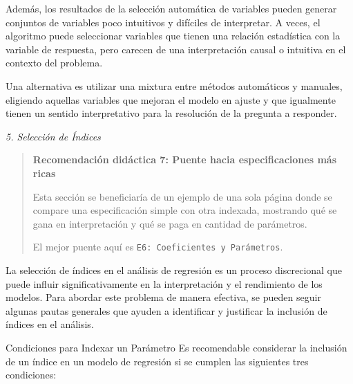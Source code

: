 \documentclass[
]{book}
\begin{document}
Además, los resultados de la selección automática de variables pueden
generar conjuntos de variables poco intuitivos y difíciles de
interpretar. A veces, el algoritmo puede seleccionar variables que
tienen una relación estadística con la variable de respuesta, pero
carecen de una interpretación causal o intuitiva en el contexto del
problema.

Una alternativa es utilizar una mixtura entre métodos automáticos y
manuales, eligiendo aquellas variables que mejoran el modelo en ajuste y
que igualmente tienen un sentido interpretativo para la resolución de la
pregunta a responder.

\emph{5. Selección de Índices}

\begin{quote}
\textbf{Recomendación didáctica 7: Puente hacia especificaciones más ricas}

Esta sección se beneficiaría de un ejemplo de una sola página donde se
compare una especificación simple con otra indexada, mostrando qué se
gana en interpretación y qué se paga en cantidad de parámetros.

El mejor puente aquí es \texttt{E6:\ Coeficientes\ y\ Parámetros}.
\end{quote}

La selección de índices en el análisis de regresión es un proceso
discrecional que puede influir significativamente en la interpretación y
el rendimiento de los modelos. Para abordar este problema de manera
efectiva, se pueden seguir algunas pautas generales que ayuden a
identificar y justificar la inclusión de índices en el análisis.

Condiciones para Indexar un Parámetro Es recomendable considerar la
inclusión de un índice en un modelo de regresión si se cumplen las
siguientes tres condiciones:
\end{document}
